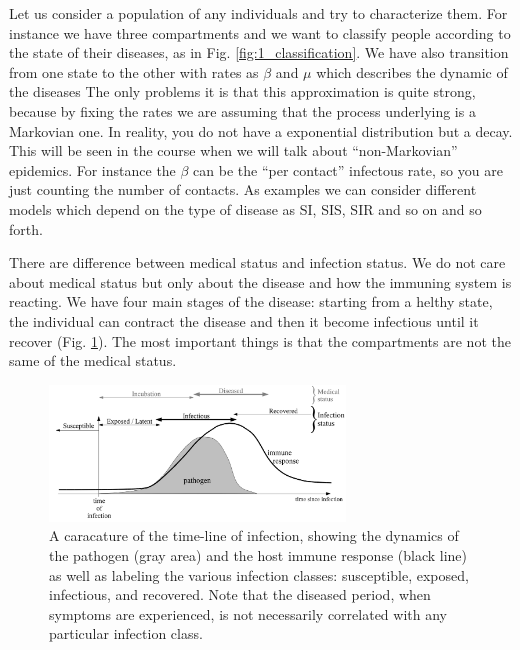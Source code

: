 \documentclass[../main/main.tex]{subfiles}
\begin{document}
Let us consider a population of any individuals and try to characterize them. For instance we have three compartments and we want to classify people according to the state of their diseases, as in Fig. \ref{fig:1_classification}. We have also transition from one state to the other with rates as \( \beta  \) and \( \mu  \) which describes the dynamic of the diseases
The only problems it is that this approximation is quite strong, because by fixing the rates we are assuming that the process underlying is a Markovian one. In reality, you do not have a exponential distribution but a decay. This will be seen in the course when we will talk about “non-Markovian” epidemics. For instance the \( \beta  \) can be the “per contact” infectous rate, so you are just counting the number of contacts.
As examples we can consider different models which depend on the type of disease as SI, SIS, SIR and so on and so forth.

There are difference between medical status and infection status. We do not care about medical status but only about the disease and how the immuning system is reacting.
We have four main stages of the disease: starting from a helthy state, the individual can contract the disease and then it become infectious until it recover (Fig. \ref{fig:2_5}). The most important things is that the compartments are not the same of the medical status.

\begin{figure}[h!]
\centering
\includegraphics[width=0.7\textwidth]{../lessons/image/02/5.png}
\caption{\label{fig:2_5} A caracature of the time-line of infection, showing the dynamics of the pathogen (gray area) and the host immune response (black line) as well as labeling the various infection classes: susceptible, exposed, infectious, and recovered. Note that the diseased period, when symptoms are experienced, is not necessarily correlated with any particular infection class.}
\end{figure}
\end{document}
